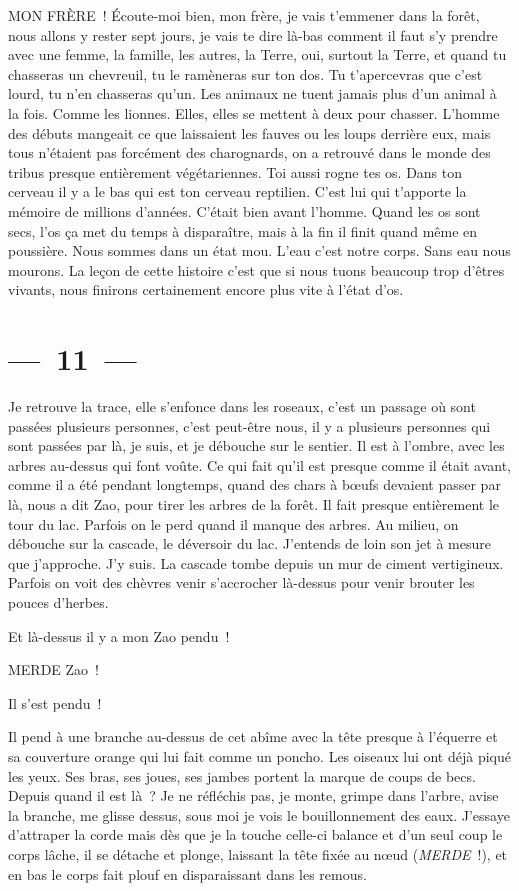 \documentclass[french,twoside]{book} %
\begin{document}
\noindent MON FRÈRE ! Écoute-moi bien, mon frère, je vais t’emmener dans la forêt, nous allons y rester sept jours, je vais te dire là-bas comment il faut s’y prendre avec une femme, la famille, les autres, la Terre, oui, surtout la Terre, et quand tu chasseras un chevreuil, tu le ramèneras sur ton dos. Tu t’apercevras que c’est lourd, tu n’en chasseras qu’un. Les animaux ne tuent jamais plus d’un animal à la fois. Comme les lionnes. Elles, elles se mettent à deux pour chasser. L’homme des débuts mangeait ce que laissaient les fauves ou les loups derrière eux, mais tous n’étaient pas forcément des charognards, on a retrouvé dans le monde des tribus presque entièrement végétariennes. Toi aussi rogne tes os. Dans ton cerveau il y a le bas qui est ton cerveau reptilien. C’est lui qui t’apporte la mémoire de millions d’années. C’était bien avant l’homme. Quand les os sont secs, l’os ça met du temps à disparaître, mais à la fin il finit quand même en poussière. Nous sommes dans un état mou. L’eau c’est notre corps. Sans eau nous mourons. La leçon de cette histoire c’est que si nous tuons beaucoup trop d’êtres vivants, nous finirons certainement encore plus vite à l’état d’os.

\section[{— 11 —}]{— 11 —}
\renewcommand{\leftmark}{— 11 —}

\noindent Je retrouve la trace, elle s’enfonce dans les roseaux, c’est un passage où sont passées plusieurs personnes, c’est peut-être nous, il y a plusieurs personnes qui sont passées par là, je suis, et je débouche sur le sentier. Il est à l’ombre, avec les arbres au-dessus qui font voûte. Ce qui fait qu’il est presque comme il était avant, comme il a été pendant longtemps, quand des chars à bœufs devaient passer par là, nous a dit Zao, pour tirer les arbres de la forêt. Il fait presque entièrement le tour du lac. Parfois on le perd quand il manque des arbres. Au milieu, on débouche sur la cascade, le déversoir du lac. J’entends de loin son jet à mesure que j’approche. J’y suis. La cascade tombe depuis un mur de ciment vertigineux. Parfois on voit des chèvres venir s’accrocher là-dessus pour venir brouter les pouces d’herbes.\par
Et là-dessus il y a mon Zao pendu !\par
\bigbreak
MERDE Zao !\par
Il s’est pendu !\par
Il pend à une branche au-dessus de cet abîme avec la tête presque à l’équerre et sa couverture orange qui lui fait comme un poncho. Les oiseaux lui ont déjà piqué les yeux. Ses bras, ses joues, ses jambes portent la marque de coups de becs. Depuis quand il est là ? Je ne réfléchis pas, je monte, grimpe dans l’arbre, avise la branche, me glisse dessus, sous moi je vois le bouillonnement des eaux. J’essaye d’attraper la corde mais dès que je la touche celle-ci balance et d’un seul coup le corps lâche, il se détache et plonge, laissant la tête fixée au nœud (\emph{MERDE} !), et en bas le corps fait plouf en disparaissant dans les remous.
\end{document}
